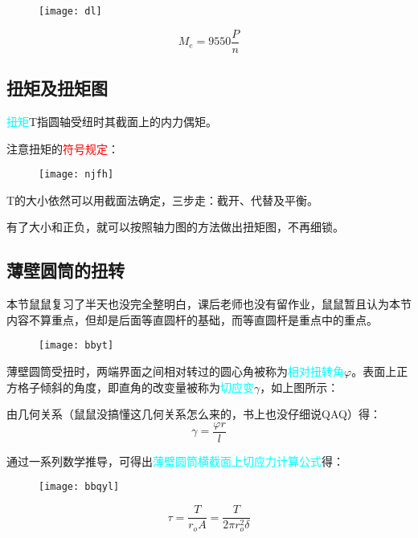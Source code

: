 \documentclass[10pt,a4paper]{ctexart}
\begin{document}
\begin{figure}[htp]%
	\centering
	\texttt{[image: dl]}
\end{figure}

\begin{equation}
	M_e=9550\frac{P}{n}
\end{equation}

\subsection{扭矩及扭矩图}
\textcolor{cyan}{扭矩}T指圆轴受纽时其截面上的内力偶矩。

注意扭矩的\textcolor{red}{符号规定}：
\begin{figure}[htp]%
	\centering
	\texttt{[image: njfh]}
\end{figure}

T的大小依然可以用截面法确定，三步走：截开、代替及平衡。

有了大小和正负，就可以按照轴力图的方法做出扭矩图，不再细锁。

\subsection{薄壁圆筒的扭转}
本节鼠鼠复习了半天也没完全整明白，课后老师也没有留作业，鼠鼠暂且认为本节内容不算重点，但却是后面等直圆杆的基础，而等直圆杆是重点中的重点。

\begin{figure}[htp]%
	\centering
	\texttt{[image: bbyt]}
\end{figure}

薄壁圆筒受扭时，两端界面之间相对转过的圆心角被称为\textcolor{cyan}{相对扭转角}$\varphi$。表面上正方格子倾斜的角度，即直角的改变量被称为\textcolor{cyan}{切应变}$\gamma$，如上图所示：

由几何关系（鼠鼠没搞懂这几何关系怎么来的，书上也没仔细说QAQ）得：
\begin{equation}
	\gamma=\frac{\varphi r}{l}
\end{equation}

通过一系列数学推导，可得出\textcolor{cyan}{薄壁圆筒横截面上切应力计算公式}得：
\begin{figure}[htp]%
	\centering
	\texttt{[image: bbqyl]}
\end{figure}
\begin{equation}
	\tau=\frac{T}{r_oA}=\frac{T}{2\pi r_o^2\delta}
\end{equation}
\end{document}
